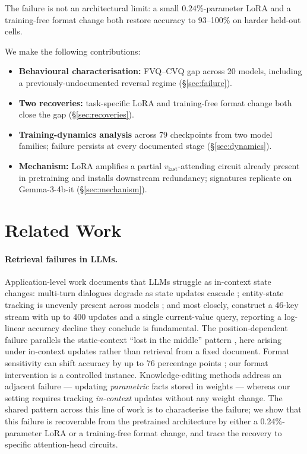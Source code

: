 \documentclass[11pt]{article}
\begin{document}
The failure is not an architectural limit: a small
$0.24\%$-parameter LoRA and a training-free format change both
restore accuracy to 93--100\% on harder held-out cells.

We make the following contributions:

\begin{itemize}
\item \textbf{Behavioural characterisation:} FVQ--CVQ gap across 20
  models, including a previously-undocumented reversal regime
  (\S\ref{sec:failure}).
\item \textbf{Two recoveries:} task-specific LoRA and training-free
  format change both close the gap
  (\S\ref{sec:recoveries}).
\item \textbf{Training-dynamics analysis} across 79 checkpoints from
  two model families; failure persists at every documented stage
  (\S\ref{sec:dynamics}).
\item \textbf{Mechanism:} LoRA amplifies a partial
  $v_{\text{last}}$-attending circuit already present in pretraining
  and installs downstream redundancy; signatures replicate on
  Gemma-3-4b-it (\S\ref{sec:mechanism}).
\end{itemize}

\section{Related Work}
\label{sec:related}

\paragraph{Retrieval failures in LLMs.}
Application-level work documents that LLMs struggle as in-context
state changes: multi-turn dialogues degrade as state updates cascade
\citep{laban2025multiturn}; entity-state tracking is unevenly present
across models \citep{kim2023entity, kim2024code, rezaee2025state};
and most closely, \citet{unable2forget2025} construct a 46-key stream
with up to 400 updates and a single current-value query, reporting
a log-linear accuracy decline they conclude is fundamental. The
position-dependent failure parallels the static-context ``lost in
the middle'' pattern \citep{lostinthemiddle}, here arising under
in-context updates rather than retrieval from a fixed document.
Format sensitivity can shift accuracy by up to 76 percentage points
\citep{sclar2024}; our format intervention is a controlled instance.
Knowledge-editing methods \citep{meng2022rome, meng2023memit} address
an adjacent failure --- updating \emph{parametric} facts stored in
weights --- whereas our setting requires tracking \emph{in-context}
updates without any weight change.
The shared pattern across this line of work is to characterise the
failure; we show that this failure is recoverable from the
pretrained architecture by either a 0.24\%-parameter LoRA or a
training-free format change, and trace the recovery to specific
attention-head circuits.
\end{document}
